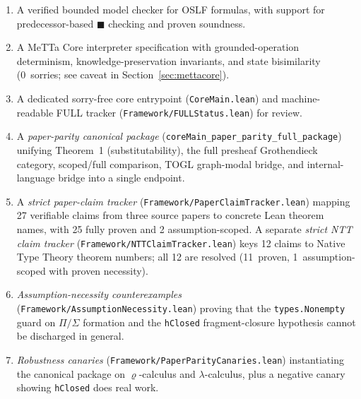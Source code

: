 \documentclass[]{article}
\newcommand{\code}[1]{\texttt{#1}}
\newcommand{\rhocalc}{\ensuremath{\varrho}}
\newcommand{\Bx}{\ensuremath{\blacksquare}}
\newcommand{\OSLF}{\textup{OSLF}}
\begin{document}
\begin{enumerate}
  \rhocalc{}-calculus language definition.
\item A verified bounded model checker for \OSLF{} formulas, with support for
  predecessor-based $\Bx$ checking and proven soundness.
\item A MeTTa Core interpreter specification with grounded-operation
  determinism, knowledge-preservation invariants, and state bisimilarity
  (0~sorries; see caveat in Section~\ref{sec:mettacore}).
\item A dedicated sorry-free core entrypoint (\code{CoreMain.lean}) and
  machine-readable FULL tracker (\code{Framework/FULLStatus.lean}) for review.
\item A \emph{paper-parity canonical package}
  (\code{coreMain\_paper\_parity\_full\_package}) unifying Theorem~1
  (substitutability), the full presheaf Grothendieck category, scoped/full
  comparison, TOGL graph-modal bridge, and internal-language bridge into a
  single endpoint.
\item A \emph{strict paper-claim tracker}
  (\code{Framework/PaperClaimTracker.lean}) mapping 27 verifiable claims from
  three source papers to concrete Lean theorem names, with 25 fully proven and
  2 assumption-scoped.  A separate \emph{strict NTT claim tracker}
  (\code{Framework/NTTClaimTracker.lean}) keys 12 claims to Native Type
  Theory theorem numbers; all 12 are resolved (11~proven, 1~assumption-scoped
  with proven necessity).
\item \emph{Assumption-necessity counterexamples}
  (\code{Framework/AssumptionNecessity.lean}) proving that the
  \code{types.Nonempty} guard on $\Pi/\Sigma$ formation and the
  \code{hClosed} fragment-closure hypothesis cannot be discharged in general.
\item \emph{Robustness canaries} (\code{Framework/PaperParityCanaries.lean})
  instantiating the canonical package on \rhocalc{}-calculus and $\lambda$-calculus,
  plus a negative canary showing \code{hClosed} does real work.
\end{enumerate}
\end{document}
